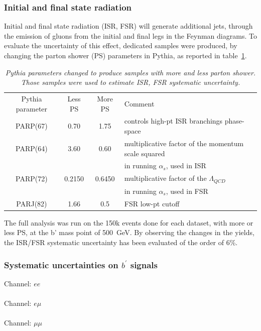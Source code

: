 \subsubsection{Initial and final state radiation}
Initial and final state radiation (ISR, FSR) will generate additional
jets, through the emission of gluons from the initial and final legs
in the Feynman diagrams. To evaluate the uncertainty of this effect,
dedicated samples were produced, by changing the parton shower (PS)
parameters in Pythia, as reported in table~\ref{tab:ISFFRS}.
\begin{table}[htbp]
\begin{center}
\caption{\textit{Pythia parameters changed to produce samples with more and less parton shower. Those samples were used to estimate ISR, FSR systematic uncertainty.}}
\label{tab:ISFFRS}
\begin{tabular}{c|c|c|l}
\hline\hline
Pythia parameter & Less PS & More PS & Comment\\
PARP(67) & 0.70   & 1.75   & controls high-pt ISR branchings phase-space \\
PARP(64) & 3.60   & 0.60   & multiplicative factor of the momentum scale squared\\
         &        &        & in running $\alpha_s$, used in ISR \\
PARP(72) & 0.2150 & 0.6450 & multiplicative factor of the $\Lambda_{QCD}$\\
         &        &        & in running $\alpha_s$, used in FSR \\
PARJ(82) & 1.66   & 0.5    & FSR low-pt cutoff \\
\hline
\end{tabular}
\end{center}
\end{table}
The full analysis was run on the 150k events done for each dataset, with more or less PS, at the b' mass point of 500~GeV.
By observing the changes in the yields, the ISR/FSR systematic uncertainty has been evaluated of the order of 6\%.

\subsubsection{Systematic uncertainties on $b^\prime$ signals}
\begin{centering}
\tiny
Channel: $ee$ \\

\\
Channel: $e \mu$ \\

\\
Channel: $\mu \mu$ \\

\\
\label{tab:systematicsBprime}
\end{centering}


